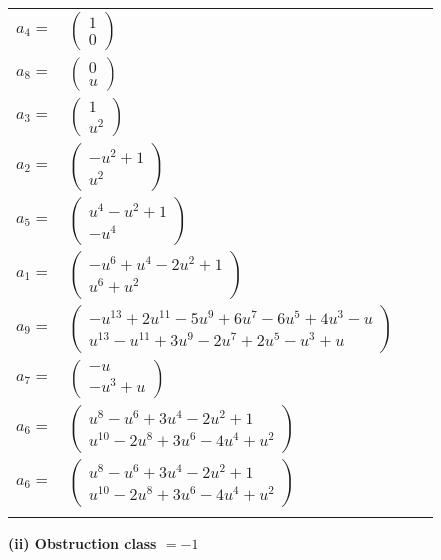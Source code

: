 \documentclass[1p]{elsarticle_modified}
\theoremstyle{definition}
\begin{document}
\begin{tabular}{m{7pt} m{180pt} m{7pt} m{180pt} }
\flushright $a_{4}=$&$\begin{pmatrix}1\\0\end{pmatrix}$ \\
\flushright $a_{8}=$&$\begin{pmatrix}0\\u\end{pmatrix}$ \\
\flushright $a_{3}=$&$\begin{pmatrix}1\\u^2\end{pmatrix}$ \\
\flushright $a_{2}=$&$\begin{pmatrix}- u^2+1\\u^2\end{pmatrix}$ \\
\flushright $a_{5}=$&$\begin{pmatrix}u^4- u^2+1\\- u^4\end{pmatrix}$ \\
\flushright $a_{1}=$&$\begin{pmatrix}- u^6+u^4-2 u^2+1\\u^6+u^2\end{pmatrix}$ \\
\flushright $a_{9}=$&$\begin{pmatrix}- u^{13}+2 u^{11}-5 u^9+6 u^7-6 u^5+4 u^3- u\\u^{13}- u^{11}+3 u^9-2 u^7+2 u^5- u^3+u\end{pmatrix}$ \\
\flushright $a_{7}=$&$\begin{pmatrix}- u\\- u^3+u\end{pmatrix}$ \\
\flushright $a_{6}=$&$\begin{pmatrix}u^8- u^6+3 u^4-2 u^2+1\\u^{10}-2 u^8+3 u^6-4 u^4+u^2\end{pmatrix}$\\ \flushright $a_{6}=$&$\begin{pmatrix}u^8- u^6+3 u^4-2 u^2+1\\u^{10}-2 u^8+3 u^6-4 u^4+u^2\end{pmatrix}$\\&\end{tabular}
\flushleft \textbf{(ii) Obstruction class $= -1$}\\~\\
\end{document}
